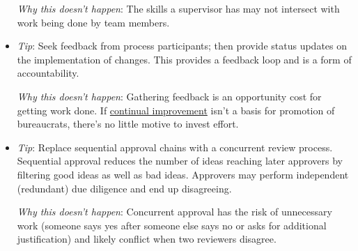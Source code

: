 \begin{itemize}
    \textit{Why this doesn't happen}: The skills a supervisor has may not intersect with work being done by team members. 
    
    \item \textit{Tip}: Seek feedback from process participants; then provide status updates on the implementation of changes. This provides a feedback loop and is a form of accountability.

    \textit{Why this doesn't happen}: Gathering feedback is an opportunity cost for getting work done. If \href{https://en.wikipedia.org/wiki/Continual_improvement_process}{continual improvement} isn't a basis for promotion of bureaucrats, there's no little motive to invest effort.
    
    \item \textit{Tip}: Replace sequential approval chains with a concurrent review process. Sequential approval reduces the number of ideas reaching later approvers by filtering good ideas as well as bad ideas. Approvers may perform independent (redundant) due diligence and end up disagreeing. 
    
    \textit{Why this doesn't happen}: Concurrent approval has the risk of unnecessary work (someone says yes after someone else says no or asks for additional justification) and likely conflict when two reviewers disagree. 
\end{itemize}
